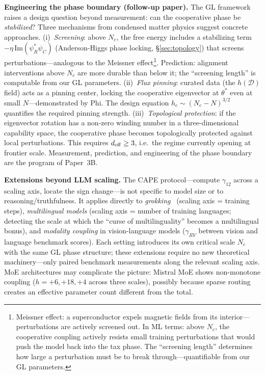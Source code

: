 \documentclass[11pt]{article}
\begin{document}
\textbf{Engineering the phase boundary (follow-up paper).}
The GL framework raises a design question beyond measurement: can the cooperative phase be \emph{stabilized}?
Three mechanisms from condensed matter physics suggest concrete approaches.
(i)~\emph{Screening}: above $N_c$, the free energy includes a stabilizing term $-\eta\,\mathrm{Im}(\psi_R^*\psi_C)$ (Anderson-Higgs phase locking, \S\ref{sec:topology}) that screens perturbations---analogous to the Meissner effect\footnote{Meissner effect: a superconductor expels magnetic fields from its interior---perturbations are actively screened out. In ML terms: above $N_c$, the cooperative coupling actively resists small training perturbations that would push the model back into the tax phase. The ``screening length'' determines how large a perturbation must be to break through---quantifiable from our GL parameters.}.
Prediction: alignment interventions above $N_c$ are more durable than below it; the ``screening length'' is computable from our GL parameters.
(ii)~\emph{Flux pinning}: curated data (the $h(\mathcal{D})$ field) acts as a pinning center, locking the cooperative eigenvector at $\theta^*$ even at small $N$---demonstrated by Phi.
The design equation $h_c \sim (N_c-N)^{3/2}$ quantifies the required pinning strength.
(iii)~\emph{Topological protection}: if the eigenvector rotation has a non-zero winding number in a three-dimensional capability space, the cooperative phase becomes topologically protected against local perturbations.
This requires $d_{\rm eff} \geq 3$, i.e.\ the regime currently opening at frontier scale.
Measurement, prediction, and engineering of the phase boundary are the program of Paper~3B.

\textbf{Extensions beyond LLM scaling.}
The CAPE protocol---compute $\gamma_{12}$ across a scaling axis, locate the sign change---is not specific to model size or to reasoning/truthfulness.
It applies directly to \emph{grokking}~\cite{power2022} (scaling axis = training steps), \emph{multilingual models} (scaling axis = number of training languages; detecting the scale at which the ``curse of multilinguality'' becomes a multilingual bonus), and \emph{modality coupling} in vision-language models ($\gamma_{RV}$ between vision and language benchmark scores).
Each setting introduces its own critical scale $N_c$ with the same GL phase structure; these extensions require no new theoretical machinery---only paired benchmark measurements along the relevant scaling axis.
MoE architectures may complicate the picture: Mistral MoE shows non-monotone coupling ($h = +6, +18, +4$ across three scales), possibly because sparse routing creates an effective parameter count different from the total.
\end{document}
